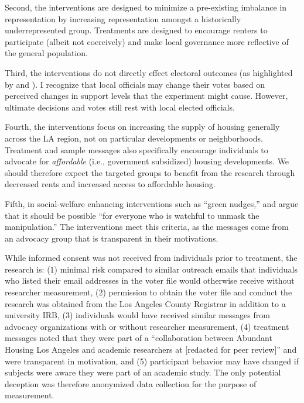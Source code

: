 \documentclass[12pt,final,fleqn]{article}
\theoremstyle{plain}
\begin{document}
Second, the interventions are designed to minimize a pre-existing imbalance in representation by increasing representation amongst a historically underrepresented group. Treatments are designed to encourage renters to participate (albeit not coercively) and make local governance more reflective of the general population.  

Third, the interventions do not directly effect electoral outcomes (as highlighted by \citet{slough2019ethics} and \citet{mcdermott2020ethics}). I recognize that local officials may change their votes based on perceived changes in support levels that the experiment might cause. However, ultimate decisions and votes still rest with local elected officials. 

Fourth, the interventions focus on increasing the supply of housing generally across the LA region, not on particular developments or neighborhoods. Treatment and sample messages also specifically encourage individuals to advocate for \textit{affordable} (i.e., government subsidized) housing developments. We should therefore expect the targeted groups to benefit from the research through decreased rents and increased access to affordable housing. 

Fifth, in social-welfare enhancing interventions such as ``green nudges,'' \citet{bovens2009ethics} and \citet{schubert2017green} argue that it should be possible ``for everyone who is watchful to unmask the manipulation.'' The interventions meet this criteria, as the messages come from an advocacy group that is transparent in their motivations.

While informed consent was not received from individuals prior to treatment, the research is: (1) minimal risk compared to similar outreach emails that individuals who listed their email addresses in the voter file would otherwise receive without researcher measurement, (2) permission to obtain the voter file and conduct the research was obtained from the Los Angeles County Registrar in addition to a university IRB, (3) individuals would have received similar messages from advocacy organizations with or without researcher measurement, (4) treatment messages noted that they were part of a ``collaboration between Abundant Housing Los Angeles and academic researchers at [redacted for peer review]'' and were transparent in motivation, and (5) participant behavior may have changed if subjects were aware they were part of an academic study. The only potential deception was therefore anonymized data collection for the purpose of measurement.  
\end{document}
